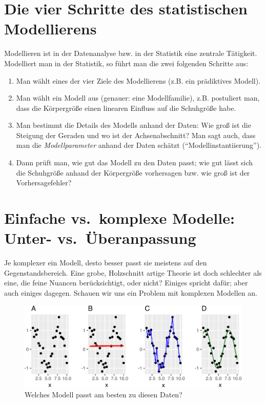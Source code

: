 \documentclass[12pt,ngerman,]{book}
\providecommand{\tightlist}{%
  \setlength{\itemsep}{0pt}\setlength{\parskip}{0pt}}
\begin{document}
\section{Die vier Schritte des statistischen
Modellierens}\label{die-vier-schritte-des-statistischen-modellierens}

Modellieren ist in der Datenanalyse bzw. in der Statistik eine zentrale
Tätigkeit. Modelliert man in der Statistik, so führt man die zwei
folgenden Schritte aus:

\begin{enumerate}
\def\labelenumi{\arabic{enumi}.}
\tightlist
\item
  Man wählt eines der vier Ziele des Modellierens (z.B. ein prädiktives
  Modell).
\item
  Man wählt ein Modell aus (genauer: eine Modellfamilie), z.B.
  postuliert man, dass die Körpergröße einen linearen Einfluss auf die
  Schuhgröße habe.
\item
  Man bestimmt die Details des Modells anhand der Daten: Wie groß ist
  die Steigung der Geraden und wo ist der Achsenabschnitt? Man sagt
  auch, dass man die \emph{Modellparameter} anhand der Daten schätzt
  (``Modellinstantiierung'').
\item
  Dann prüft man, wie gut das Modell zu den Daten passt; wie gut lässt
  sich die Schuhgröße anhand der Körpergröße vorhersagen bzw. wie groß
  ist der Vorhersagefehler?
\end{enumerate}

\section{Einfache vs.~komplexe Modelle: Unter-
vs.~Überanpassung}\label{einfache-vs.komplexe-modelle-unter--vs.uberanpassung}

Je komplexer ein Modell, desto besser passt sie meistens auf den
Gegenstandsbereich. Eine grobe, Holzschnitt artige Theorie ist doch
schlechter als eine, die feine Nuancen berücksichtigt, oder nicht?
Einiges spricht dafür; aber auch einiges dagegen. Schauen wir uns ein
Problem mit komplexen Modellen an.

\begin{figure}

{\centering \includegraphics[width=0.9\linewidth]{060_Modellieren_files/figure-latex/overfitting-4-plots-1} 

}

\caption{Welches Modell passt am besten zu diesen Daten?}\label{fig:overfitting-4-plots}
\end{figure}
\end{document}
